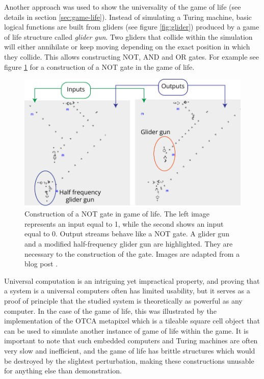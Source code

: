 Another approach was used to show the universality of the game of life (see
details in section \ref{sec:game-life}). Instead of simulating a Turing machine,
basic logical functions are built from gliders (see figure \ref{fig:glider})
produced by a game of life structure called \emph{glider gun}. Two gliders that
collide within the simulation will either annihilate or keep moving depending on
the exact position in which they collide. This allows constructing NOT, AND and
OR gates. For example see figure \ref{fig:gol_not_gate} for a construction of a
NOT gate in the game of life.

\begin{figure}[htbp]
  \centering
  \includegraphics[width=.8\linewidth]{figures/gol_not_gate}
  \caption{Construction of a NOT gate in game of life. The left image represents
    an input equal to 1, while the second shows an input equal to 0. Output
    streams behave like a NOT gate. A glider gun and a modified half-frequency
    glider gun are highlighted. They are necessary to the construction of the
    gate. Images are adapted from a blog post
    \parencite{carliniDigitalLogicGates2020}.}
  \label{fig:gol_not_gate}
\end{figure}

Universal computation is an intriguing yet impractical property, and proving
that a system is a universal computers often has limited usability, but it
serves as a proof of principle that the studied system is theoretically as
powerful as any computer. In the case of the game of life, this was illustrated
by the implementation of the OTCA metapixel which is a tileable square cell
object that can be used to simulate another instance of game of life within the
game. It is important to note that such embedded computers and Turing machines
are often very slow and inefficient, and the game of life has brittle structures
which would be destroyed by the slightest perturbation, making these
constructions unusable for anything else than demonstration.

